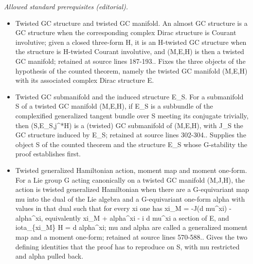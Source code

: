 \documentclass{article}
\numberwithin{equation}{section}
\begin{document}
\noindent\textit{Allowed standard prerequisites (editorial).}\begin{itemize}
\item Twisted GC structure and twisted GC manifold. An almost GC structure is a GC structure when the corresponding complex Dirac structure is Courant involutive; given a closed three-form H, it is an H-twisted GC structure when the structure is H-twisted Courant involutive, and (M,E,H) is then a twisted GC manifold; retained at source lines 187-193.. Fixes the three objects of the hypothesis of the counted theorem, namely the twisted GC manifold (M,E,H) with its associated complex Dirac structure E.
\item Twisted GC submanifold and the induced structure E\_S. For a submanifold S of a twisted GC manifold (M,E,H), if E\_S is a subbundle of the complexified generalized tangent bundle over S meeting its conjugate trivially, then (S,E\_S,j\textasciicircum{}*H) is a (twisted) GC submanifold of (M,E,H), with J\_S the GC structure induced by E\_S; retained at source lines 302-304.. Supplies the object S of the counted theorem and the structure E\_S whose G-stability the proof establishes first.
\item Twisted generalized Hamiltonian action, moment map and moment one-form. For a Lie group G acting canonically on a twisted GC manifold (M,J,H), the action is twisted generalized Hamiltonian when there are a G-equivariant map mu into the dual of the Lie algebra and a G-equivariant one-form alpha with values in that dual such that for every xi one has xi\_M = -J(d mu\textasciicircum{}xi) - alpha\textasciicircum{}xi, equivalently xi\_M + alpha\textasciicircum{}xi - i d mu\textasciicircum{}xi a section of E, and iota\_\{xi\_M\} H = d alpha\textasciicircum{}xi; mu and alpha are called a generalized moment map and a moment one-form; retained at source lines 570-588.. Gives the two defining identities that the proof has to reproduce on S, with mu restricted and alpha pulled back.
\end{itemize}\medskip
\end{document}
